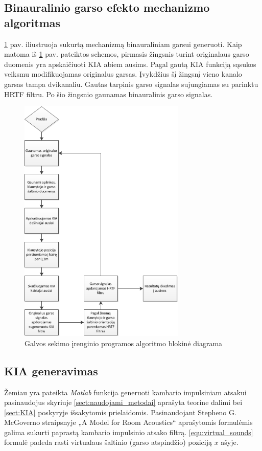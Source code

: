 \documentclass[]{vgtuef}
\begin{document}
{\subsection{Binauralinio garso efekto mechanizmo algoritmas}

\ref{fig:binaural_schem} pav. iliustruoja sukurtą mechanizmą binauraliniam garsui generuoti. Kaip matoma iš \ref{fig:binaural_schem} pav. pateiktos schemos, pirmasis žingsnis turint originalaus garso duomenis yra apskaičiuoti KIA abiem ausims. Pagal gautą KIA funkciją sąsukos veiksmu modifikuojamas originalus garsas. Įvykdžius šį žingsnį vieno kanalo garsas tampa dvikanaliu. Gautas tarpinis garso signalas sujungiamas su parinktu HRTF filtru. Po šio žingsnio gaunamas binauralinis garso signalas.

\begin{figure}[!ht]
  \centering
  \includegraphics[width=300px]{img/binaural_schem.png}
  \caption{Galvos sekimo įrenginio programos algoritmo blokinė diagrama}
  \label{fig:binaural_schem}
\end{figure}

\subsection{KIA generavimas}

Žemiau yra pateikta \textit{Matlab} funkcija generuoti kambario impulsiniam atsakui pasinaudojus skyriuje \ref{sect:naudojami_metodai} aprašyta teorine dalimi bei \ref{sect:KIA} poskyryje išsakytomis prielaidomis.
Pasinaudojant Stepheno G. McGoverno straipsnyje „A Model for Room Acoustics“ aprašytomis formulėmis galima sukurti paprastą kambario impulsinio atsako filtrą.
\ref{equ:virtual_sounds} formulė padeda rasti virtualaus šaltinio (garso atspindžio) poziciją $x$ ašyje. 

}
\end{document}
